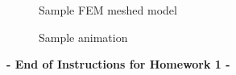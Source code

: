 \documentclass[12pt,a4paper]{article}
\begin{document}
\begin{figure}[!h]
  \begin{center}
    \caption{Sample FEM meshed model}
    \label{samplelabel}
  \end{center}
\end{figure}



\begin{figure}[!h]
  \begin{center}
    \caption{Sample animation}
    \label{sampleanim}
  \end{center}
\end{figure}


\bigskip

\bigskip

\begin{center}
  \textbf{- End of Instructions for Homework 1 -}
\end{center}
\end{document}
